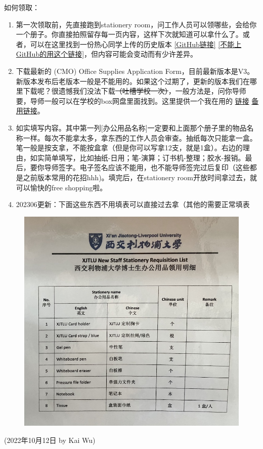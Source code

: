 \hfill\break
如何领取：
\begin{enumerate}
    \item 第一次领取前，先直接跑到stationery room，问工作人员可以领哪些，会给你一个册子。你直接拍照留存每一页内容，这样下次就知道可以拿什么了。或者，可以在这里找到一份热心同学上传的历史版本 \href{https://github.com/kaiwu-astro/xp_pgrs_unofficial_guide/tree/main/fileshare}{[GitHub链接]} \href{https://gitee.com/kaiwu-astro/xp_pgrs_unofficial_guide/tree/main/fileshare}{[不能上GitHub的用这个链接]}，但内容可能会变动而有少许差异。
    \item 下载最新的 (CMO) Office Supplies Application Form，目前最新版本是V3。新版本发布后老版本一般是不能用的。如果这个过期了，更新的版本我们在哪里下载呢？很遗憾我们没法下载\sout{（吐槽学校一次）}，一般方法是，问你导师要，导师一般可以在学校的box网盘里面找到。这里提供一个我在用的 \href{https://github.com/kaiwu-astro/xp_pgrs_unofficial_guide/tree/main/fileshare}{链接} \href{https://gitee.com/kaiwu-astro/xp_pgrs_unofficial_guide/tree/main/fileshare}{备用链接}。
    \item 如实填写内容。其中第一列[办公用品名称]一定要和上面那个册子里的物品名称一样。每次不能拿太多，拿东西的工作人员会审查。抽纸每次只能拿一盒。笔一般是按支拿，不能按盒拿（但是你可以写拿12支，就是1盒）。右边的理由，如实简单填写，比如抽纸-日用；笔-演算；订书机-整理；胶水-报销。最后，要你导师签字。电子签名应该不能用，也不能导师签完过后复印（这些都是之前版本常用的花招hhh)。填完后，在stationery room开放时间拿过去，就可以愉快的free shopping啦。
    \item 202306更新：下面这些东西不用填表可以直接过去拿（其他的需要正常填表
\end{enumerate}

\begin{figure}[H]
    \centering
    \includegraphics[width=0.6\columnwidth]{author-folder/Kai.Wu/stationery_no_sign.jpg}
\end{figure}


\begin{flushright}
(2022年10月12日 by Kai Wu)
\end{flushright}

